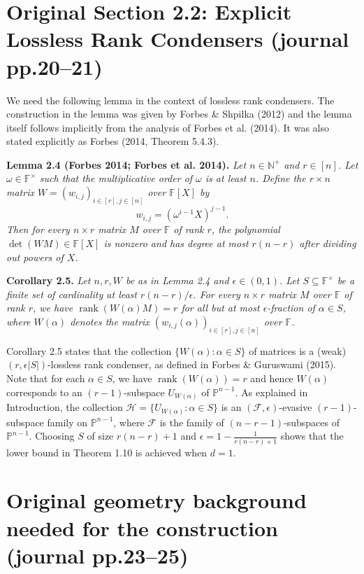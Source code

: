 \documentclass[10pt,a4paper]{article}
\newcommand{\FF}{\mathbb F}
\newcommand{\PP}{\mathbb P}
\newenvironment{result}[1]{\par\medskip\noindent\textbf{#1.}\itshape}{\par\medskip}
\begin{document}
\section*{Original Section 2.2: Explicit Lossless Rank Condensers (journal pp.20--21)}
We need the following lemma in the context of lossless rank condensers. The construction in the lemma was given by Forbes \& Shpilka (2012) and the lemma itself follows implicitly from the analysis of Forbes et al. (2014). It was also stated explicitly as Forbes (2014, Theorem 5.4.3).
\begin{result}{Lemma 2.4 (Forbes 2014; Forbes et al. 2014)}
Let $n\in\mathbb N^+$ and $r\in[n]$. Let $\omega\in\FF^\times$ such that the multiplicative order of $\omega$ is at least $n$. Define the $r\times n$ matrix $W=(w_{i,j})_{i\in[r],j\in[n]}$ over $\FF[X]$ by
\[w_{i,j}=(\omega^{i-1}X)^{j-1}.\]
Then for every $n\times r$ matrix $M$ over $\FF$ of rank $r$, the polynomial $\det(WM)\in\FF[X]$ is nonzero and has degree at most $r(n-r)$ after dividing out powers of $X$.
\end{result}
\begin{result}{Corollary 2.5}
Let $n,r,W$ be as in Lemma 2.4 and $\epsilon\in(0,1)$. Let $S\subseteq\FF^\times$ be a finite set of cardinality at least $r(n-r)/\epsilon$. For every $n\times r$ matrix $M$ over $\FF$ of rank $r$, we have $\operatorname{rank}(W(\alpha)M)=r$ for all but at most $\epsilon$-fraction of $\alpha\in S$, where $W(\alpha)$ denotes the matrix $(w_{i,j}(\alpha))_{i\in[r],j\in[n]}$ over $\FF$.
\end{result}
Corollary 2.5 states that the collection $\{W(\alpha):\alpha\in S\}$ of matrices is a (weak) $(r,\epsilon|S|)$-lossless rank condenser, as defined in Forbes \& Guruswami (2015). Note that for each $\alpha\in S$, we have $\operatorname{rank}(W(\alpha))=r$ and hence $W(\alpha)$ corresponds to an $(r-1)$-subspace $U_{W(\alpha)}$ of $\PP^{n-1}$. As explained in Introduction, the collection $\mathcal H=\{U_{W(\alpha)}:\alpha\in S\}$ is an $(\mathcal F,\epsilon)$-evasive $(r-1)$-subspace family on $\PP^{n-1}$, where $\mathcal F$ is the family of $(n-r-1)$-subspaces of $\PP^{n-1}$. Choosing $S$ of size $r(n-r)+1$ and $\epsilon=1-\frac1{r(n-r)+1}$ shows that the lower bound in Theorem 1.10 is achieved when $d=1$.

\section*{Original geometry background needed for the construction (journal pp.23--25)}
\end{document}
